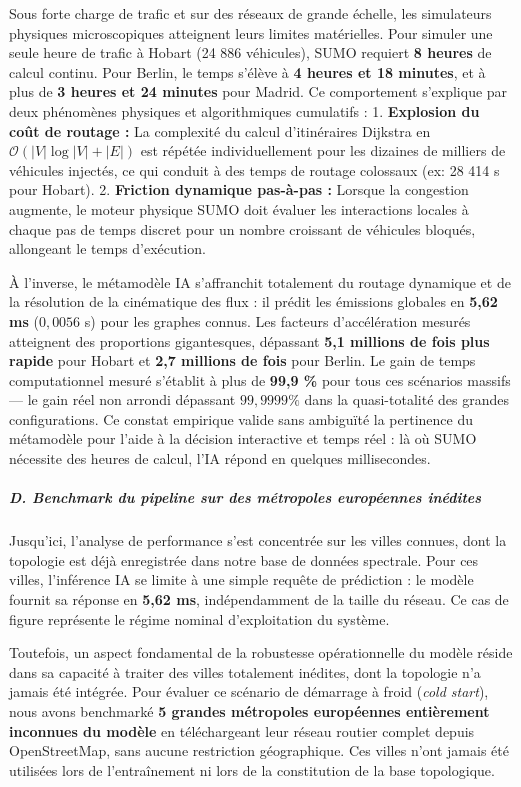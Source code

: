 \documentclass[10pt, a4paper]{article}
\begin{document}
Sous forte charge de trafic et sur des réseaux de grande échelle, les
simulateurs physiques microscopiques atteignent leurs limites
matérielles. Pour simuler une seule heure de trafic à Hobart (24 886
véhicules), SUMO requiert \textbf{8 heures} de calcul continu. Pour
Berlin, le temps s'élève à \textbf{4 heures et 18 minutes}, et à plus de
\textbf{3 heures et 24 minutes} pour Madrid. Ce comportement s'explique
par deux phénomènes physiques et algorithmiques cumulatifs : 1.
\textbf{Explosion du coût de routage :} La complexité du calcul
d'itinéraires Dijkstra en \(\mathcal{O}(|V| \log |V| + |E|)\) est
répétée individuellement pour les dizaines de milliers de véhicules
injectés, ce qui conduit à des temps de routage colossaux (ex: 28 414 s
pour Hobart). 2. \textbf{Friction dynamique pas-à-pas :} Lorsque la
congestion augmente, le moteur physique SUMO doit évaluer les
interactions locales à chaque pas de temps discret pour un nombre
croissant de véhicules bloqués, allongeant le temps d'exécution.

À l'inverse, le métamodèle IA s'affranchit totalement du routage
dynamique et de la résolution de la cinématique des flux : il prédit les
émissions globales en \textbf{5,62 ms} (\(0,0056\) s) pour les graphes
connus. Les facteurs d'accélération mesurés atteignent des proportions
gigantesques, dépassant \textbf{5,1 millions de fois plus rapide} pour
Hobart et \textbf{2,7 millions de fois} pour Berlin. Le gain de temps
computationnel mesuré s'établit à plus de \textbf{99,9 \%} pour tous ces
scénarios massifs --- le gain réel non arrondi dépassant \(99{,}9999\%\)
dans la quasi-totalité des grandes configurations. Ce constat empirique
valide sans ambiguïté la pertinence du métamodèle pour l'aide à la
décision interactive et temps réel : là où SUMO nécessite des heures de
calcul, l'IA répond en quelques millisecondes.

\subparagraph{D. Benchmark du pipeline sur des métropoles européennes
inédites}\label{d.-benchmark-du-pipeline-sur-des-muxe9tropoles-europuxe9ennes-inuxe9dites}

Jusqu'ici, l'analyse de performance s'est concentrée sur les villes
connues, dont la topologie est déjà enregistrée dans notre base de
données spectrale. Pour ces villes, l'inférence IA se limite à une
simple requête de prédiction : le modèle fournit sa réponse en
\textbf{5,62 ms}, indépendamment de la taille du réseau. Ce cas de
figure représente le régime nominal d'exploitation du système.

Toutefois, un aspect fondamental de la robustesse opérationnelle du
modèle réside dans sa capacité à traiter des villes totalement inédites,
dont la topologie n'a jamais été intégrée. Pour évaluer ce scénario de
démarrage à froid (\emph{cold start}), nous avons benchmarké \textbf{5
grandes métropoles européennes entièrement inconnues du modèle} en
téléchargeant leur réseau routier complet depuis OpenStreetMap, sans
aucune restriction géographique. Ces villes n'ont jamais été utilisées
lors de l'entraînement ni lors de la constitution de la base
topologique.
\end{document}
